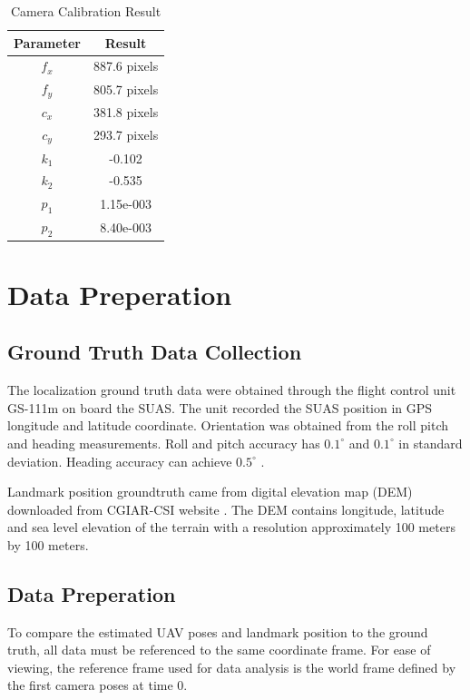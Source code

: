 \begin{table}[h]
\caption{Camera Calibration Result}
\label{tab:camcalresult}
\centering
\begin{tabular}{|c|c|}
\hline
Parameter & Result\\ \hline
$f_x$ & 887.6 pixels \\ \hline
$f_y$ & 805.7 pixels\\ \hline
$c_x$ & 381.8 pixels\\ \hline
$c_y$ & 293.7 pixels\\ \hline
$k_1$ & -0.102 \\ \hline
$k_2$ & -0.535 \\ \hline
$p_1$ & 1.15e-003 \\ \hline
$p_2$ & 8.40e-003 \\
\hline
\end{tabular}
\end{table}
\FloatBarrier

\section{Data Preperation}
\subsection{Ground Truth Data Collection}
The localization ground truth data were obtained through the flight
control unit GS-111m on board the SUAS. The unit recorded the SUAS
position in GPS longitude and latitude coordinate. Orientation was
obtained from the roll pitch and heading measurements. Roll and pitch
accuracy has $0.1^\circ$ and $0.1^\circ$ in standard deviation.
Heading accuracy can achieve $0.5^\circ$ \cite{_athena_????}.

Landmark position groundtruth came from digital elevation map (DEM)
downloaded from CGIAR-CSI website \cite{_cgiar-csi_????}. The DEM
contains longitude, latitude and sea level elevation of the terrain
with a resolution approximately 100 meters by 100 meters. 


\subsection{Data Preperation}
To compare the estimated UAV poses and landmark position to the ground
truth, all data must be referenced to the same coordinate frame. For
ease of viewing, the reference frame used for data analysis is the
world frame defined by the first camera poses at time 0. 

